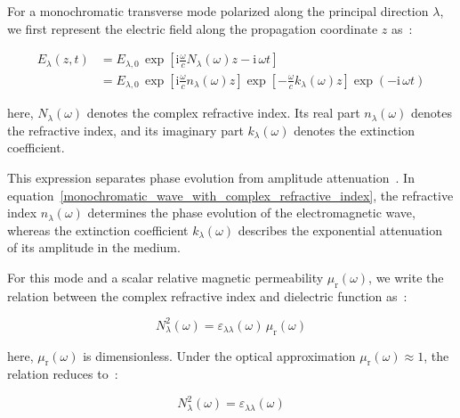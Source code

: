 For a monochromatic transverse mode polarized along the principal direction $\lambda$,
we first represent the electric field along the propagation coordinate $z$ as~\cite{politano2023spectroscopic}:

\begin{equation}
\begin{aligned}
    E_{\lambda}(z,t)
    &= E_{\lambda,0}\,
    \exp\left[\mathrm{i}\frac{\omega}{c}N_{\lambda}(\omega)z-\mathrm{i}\,\omega t\right]\\
    &= E_{\lambda,0}\,
    \exp\left[\mathrm{i}\frac{\omega}{c}n_{\lambda}(\omega)z\right]
    \exp\left[-\frac{\omega}{c}k_{\lambda}(\omega)z\right]
    \exp\left(-\mathrm{i}\,\omega t\right)
\end{aligned}
\label{monochromatic_wave_with_complex_refractive_index}
\end{equation}

here, $N_{\lambda}(\omega)$ denotes the complex refractive index.
Its real part $n_{\lambda}(\omega)$ denotes the refractive index,
and its imaginary part $k_{\lambda}(\omega)$ denotes the extinction coefficient.

This expression separates phase evolution from amplitude attenuation~\cite{wooten2013optical,dressel2002electrodynamics,born2013principles}.
In equation~\eqref{monochromatic_wave_with_complex_refractive_index},
the refractive index $n_{\lambda}(\omega)$ determines the phase evolution of the electromagnetic wave,
whereas the extinction coefficient $k_{\lambda}(\omega)$ describes the exponential attenuation of its amplitude in the medium.

For this mode and a scalar relative magnetic permeability $\mu_{\mathrm{r}}(\omega)$,
we write the relation between the complex refractive index and dielectric function as~\cite{born2013principles,wooten2013optical,dressel2002electrodynamics,politano2023spectroscopic}:

\begin{equation}
    N_{\lambda}^{2}(\omega)
    = \varepsilon_{\lambda\lambda}(\omega)\,\mu_{\mathrm{r}}(\omega)
\label{general_refractive_index_permeability_relation}
\end{equation}

here, $\mu_{\mathrm{r}}(\omega)$ is dimensionless.
Under the optical approximation $\mu_{\mathrm{r}}(\omega)\approx1$,
the relation reduces to~\cite{wooten2013optical,dressel2002electrodynamics,born2013principles}:

\begin{equation}
    N_{\lambda}^{2}(\omega)
    = \varepsilon_{\lambda\lambda}(\omega)
\label{nonmagnetic_refractive_index_dielectric_relation}
\end{equation}


